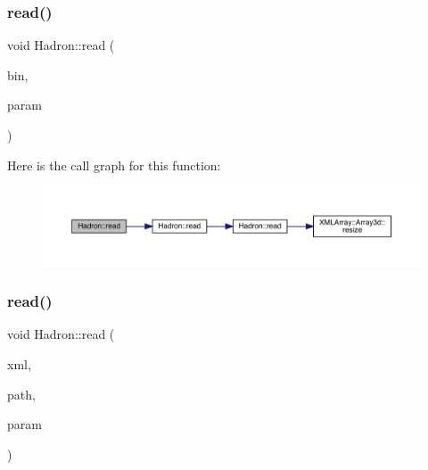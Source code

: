 \subsubsection{\texorpdfstring{read()}{read()}\hspace{0.1cm}{\footnotesize\ttfamily [11/94]}}
{\footnotesize\ttfamily void Hadron\+::read (\begin{DoxyParamCaption}\item[{\mbox{\hyperlink{classADATIO_1_1BinaryReader}{Binary\+Reader}} \&}]{bin,  }\item[{\mbox{\hyperlink{structHadron_1_1HadronNptType__t}{Hadron\+Npt\+Type\+\_\+t}} \&}]{param }\end{DoxyParamCaption})}

Here is the call graph for this function\+:
\nopagebreak
\begin{figure}[H]
\begin{center}
\leavevmode
\includegraphics[width=350pt]{d1/daf/namespaceHadron_a7f12085b340a6e0bfb52b3d920cfeb1e_cgraph}
\end{center}
\end{figure}
\mbox{\label{namespaceHadron_aaef0a2bed7d8dd73e0611d46f68b4ee6}} 
\subsubsection{\texorpdfstring{read()}{read()}\hspace{0.1cm}{\footnotesize\ttfamily [12/94]}}
{\footnotesize\ttfamily void Hadron\+::read (\begin{DoxyParamCaption}\item[{\mbox{\hyperlink{classADATXML_1_1XMLReader}{X\+M\+L\+Reader}} \&}]{xml,  }\item[{const std\+::string \&}]{path,  }\item[{\mbox{\hyperlink{structHadron_1_1KeyHadronSUNNPartNPtCorr__t_1_1NPoint__t}{Key\+Hadron\+S\+U\+N\+N\+Part\+N\+Pt\+Corr\+\_\+t\+::\+N\+Point\+\_\+t}} \&}]{param }\end{DoxyParamCaption})}

